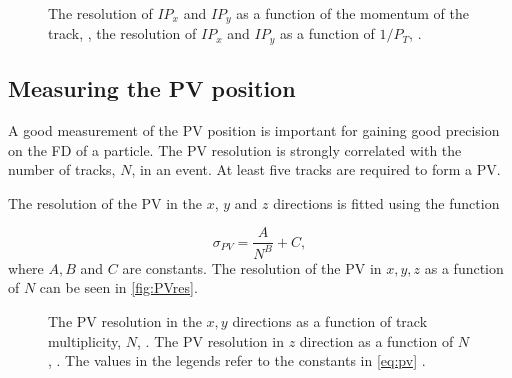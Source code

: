 \begin{figure}
  \centering
  \caption{The resolution of $IP_{x}$ and $IP_{y}$ as a function of the momentum of the track, \protect{}, the resolution of $IP_{x}$ and $IP_{y}$ as a function of $1/P_{T}$, \protect{} \cite{LHCb-DP-2014-001}.}
  \label{fig:IP}
\end{figure}

\subsection{Measuring the PV position}
A good measurement of the PV position is important for gaining good precision on the FD of a particle. The PV resolution is strongly correlated with the number of tracks, $N$, in an event. At least five tracks are required to form a PV. %

The resolution of the PV in the $x$, $y$ and $z$ directions is fitted using the function

\begin{equation}
  \sigma_{PV} = \frac{A}{N^{B}} + C,
  \label{eq:pv}
\end{equation}
where $A, B$ and $C$ are constants. The resolution of the PV in $x,y,z$ as a function of $N$ can be seen in \autoref{fig:PVres}.
\begin{figure}
  \centering
  \caption{The PV resolution in the $x,y$ directions as a function of track multiplicity, $N$, \protect{}. The PV resolution in $z$ direction as a function of $N$, \protect{}. The values in the legends refer to the constants in \autoref{eq:pv} \cite{LHCb-DP-2014-001}.
  }
  \label{fig:PVres}
\end{figure}

